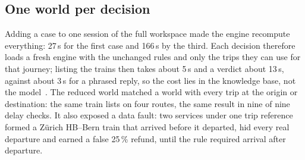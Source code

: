 
\subsection{One world per decision}

Adding a case to one session of the full workspace made the engine recompute everything: 27\,s for the first case and 166\,s by the third. Each decision therefore loads a fresh engine with the unchanged rules and only the trips they can use for that journey; listing the trains then takes about 5\,s and a verdict about 13\,s, against about 3\,s for a phrased reply, so the cost lies in the knowledge base, not the model~\citep{rechsteiner2026adr0001,rechsteiner2026adr0002}. The reduced world matched a world with every trip at the origin or destination: the same train lists on four routes, the same result in nine of nine delay checks. It also exposed a data fault: two services under one trip reference formed a Z\"urich HB--Bern train that arrived before it departed, hid every real departure and earned a false 25\,\% refund, until the rule required arrival after departure.
